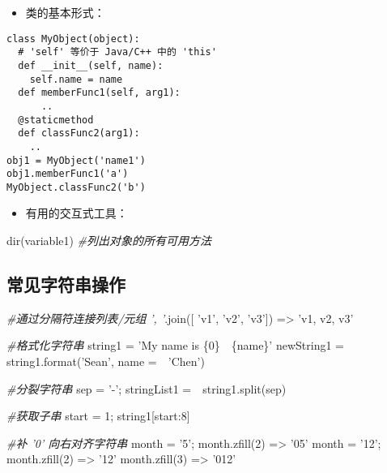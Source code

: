 \documentclass[]{ctexart}
\newenvironment{Shaded}{}{}
\newcommand{\DecValTok}[1]{\textcolor[rgb]{0.25,0.63,0.44}{{#1}}}
\newcommand{\SpecialCharTok}[1]{\textcolor[rgb]{0.25,0.44,0.63}{{#1}}}
\newcommand{\StringTok}[1]{\textcolor[rgb]{0.25,0.44,0.63}{{#1}}}
\newcommand{\CommentTok}[1]{\textcolor[rgb]{0.38,0.63,0.69}{\textit{{#1}}}}
\newcommand{\OperatorTok}[1]{\textcolor[rgb]{0.40,0.40,0.40}{{#1}}}
\newcommand{\BuiltInTok}[1]{{#1}}
\newcommand{\NormalTok}[1]{{#1}}
\begin{document}
\begin{itemize}
\item
  类的基本形式：
\end{itemize}

\begin{verbatim}
class MyObject(object):
  # 'self' 等价于 Java/C++ 中的 'this'
  def __init__(self, name):
    self.name = name
  def memberFunc1(self, arg1):
      ..
  @staticmethod
  def classFunc2(arg1):
    ..
obj1 = MyObject('name1')
obj1.memberFunc1('a')
MyObject.classFunc2('b')
\end{verbatim}

\begin{itemize}
\item
  有用的交互式工具：
\end{itemize}

\begin{Shaded}
\begin{Highlighting}[]
\BuiltInTok{dir}\NormalTok{(variable1) }\CommentTok{#列出对象的所有可用方法}
\end{Highlighting}
\end{Shaded}

\hypertarget{header-n349}{\subsection{常见字符串操作}\label{header-n349}}

\begin{Shaded}
\begin{Highlighting}[]
\CommentTok{#通过分隔符连接列表/元组}
\CommentTok{', '}\NormalTok{.join([ }\StringTok{'v1'}\NormalTok{, }\StringTok{'v2'}\NormalTok{, }\StringTok{'v3'}\NormalTok{]) }\OperatorTok{=>} \StringTok{'v1, v2, v3'}

\CommentTok{#格式化字符串}
\NormalTok{string1 }\OperatorTok{=} \StringTok{'My name is }\SpecialCharTok{\{0\}}\StringTok{　}\SpecialCharTok{\{name\}}\StringTok{'}
\NormalTok{newString1 }\OperatorTok{=} \NormalTok{string1.}\BuiltInTok{format}\NormalTok{(}\StringTok{'Sean'}\NormalTok{, name }\OperatorTok{=}　\StringTok{'Chen'}\NormalTok{)}

\CommentTok{#分裂字符串}
\NormalTok{sep }\OperatorTok{=} \StringTok{'-'}\OperatorTok{;}
\NormalTok{stringList1 }\OperatorTok{=}　\NormalTok{string1.split(sep)}

\CommentTok{#获取子串}
\NormalTok{start }\OperatorTok{=} \DecValTok{1}\OperatorTok{;}
\NormalTok{string1[start:}\DecValTok{8}\NormalTok{]}

\CommentTok{#补 '0' 向右对齐字符串}
\NormalTok{month }\OperatorTok{=} \StringTok{'5'}\OperatorTok{;}
\NormalTok{month.zfill(}\DecValTok{2}\NormalTok{) }\OperatorTok{=>} \StringTok{'05'}
\NormalTok{month }\OperatorTok{=} \StringTok{'12'}\OperatorTok{;}
\NormalTok{month.zfill(}\DecValTok{2}\NormalTok{) }\OperatorTok{=>} \StringTok{'12'}
\NormalTok{month.zfill(}\DecValTok{3}\NormalTok{) }\OperatorTok{=>} \StringTok{'012'}
\end{Highlighting}
\end{Shaded}
\end{document}
